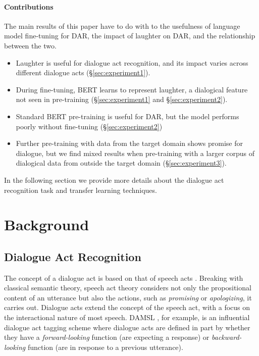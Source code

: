\documentclass[11pt,a4paper]{article}
\begin{document}
\paragraph{Contributions}
The main results of this paper have to do with to the usefulness of language model fine-tuning for DAR, the impact of laughter on DAR, and the relationship between the two.
\begin{itemize}
  \item Laughter is useful for dialogue act recognition, and its impact varies across different dialogue acts (\S\ref{sec:experiment1}).
  \item During fine-tuning, BERT learns to represent laughter, a dialogical feature not seen in pre-training (\S\ref{sec:experiment1} and \S\ref{sec:experiment2}).
  \item Standard BERT pre-training is useful for DAR, but the model performs poorly without fine-tuning (\S\ref{sec:experiment2})
  \item Further pre-training with data from the target domain shows promise for dialogue, but we find mixed results when pre-training with a larger corpus of dialogical data from outside the target domain (\S\ref{sec:experiment3}).
  \end{itemize}

In the following section we provide more details about the dialogue act recognition task and transfer learning techniques. 


\section{Background}

\subsection{Dialogue Act Recognition}
The concept of a dialogue act is based on that of speech acts \citep{austinHowThingsWords2009}.
Breaking with classical semantic theory, speech act theory considers not only the propositional content of an utterance but also the actions, such as \emph{promising} or \emph{apologizing}, it carries out.
Dialogue acts extend the concept of the speech act, with a focus on the interactional nature of most speech.
DAMSL \citep{coreCodingDialogsDAMSL1997}, for example, is an influential dialogue act tagging scheme where dialogue acts are defined in part by whether they have a \emph{forward-looking} function (are expecting a response) or \emph{backward-looking} function (are in response to a previous utterance).
\end{document}
